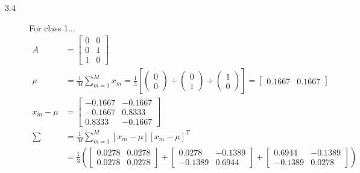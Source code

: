 \documentclass[fleqn]{article}
\begin{document}
\begin{description}
\item [3.4]
    For class 1...
    \begin{align*}
        A &= \begin{bmatrix}
                0 & 0 \\
                0 & 1 \\
                1 & 0
             \end{bmatrix} \\
        \mu &= \frac{1}{M} \sum_{m=1}^{M}{x_m} = \frac{1}{3} \left [ \begin{pmatrix}0 \\ 0\end{pmatrix} +
                                                                     \begin{pmatrix}0 \\ 1\end{pmatrix} +
                                                                     \begin{pmatrix}1 \\ 0\end{pmatrix} \right ]
                                               = \begin{bmatrix} 0.1667 & 0.1667 \end{bmatrix} \\
        x_m - \mu &= \begin{bmatrix}
                        -0.1667 & -0.1667 \\
                        -0.1667 &  0.8333 \\
                         0.8333 & -0.1667
                     \end{bmatrix} \\
        \sum &= \frac{1}{M} \sum_{m=1}^{M}{\left [ x_m - \mu \right ] \left [ x_m - \mu \right ]^T} \\
             &= \frac{1}{3} \left ( \begin{bmatrix} 0.0278 & 0.0278 \\ 0.0278 & 0.0278 \end{bmatrix} +
                                    \begin{bmatrix} 0.0278 & -0.1389 \\ -0.1389 & 0.6944 \end{bmatrix} +
                                    \begin{bmatrix} 0.6944 & -0.1389 \\ -0.1389 & 0.0278 \end{bmatrix} \right ) \\

\end{align*}
\end{description}
\end{document}
